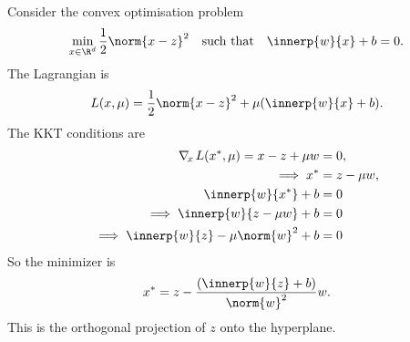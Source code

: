\begin{example}
    Consider the convex optimisation problem \[
        \min_{x \in \R^d} \frac12 \norm{x - z}^2 \quad \text{such that}
            \quad \innerp{w}{x} + b = 0.
    \] The Lagrangian is \[
        L(x, \mu) = \frac12 \norm{x - z}^2 + \mu(\innerp{w}{x} + b).
    \] The KKT conditions are \begin{align*}
        \nabla_{\!x\,} L(x^*, \mu) = x - z + \mu w &= 0, \\
        \implies x^* &= z - \mu w, \\
        \innerp{w}{x^*} + b &= 0 \\
        \implies \innerp{w}{z - \mu w} + b &= 0 \\
        \implies \innerp{w}{z} - \mu \norm{w}^2 + b &= 0
    \end{align*}
    So the minimizer is \[
        x^* = z - \frac{(\innerp{w}{z} + b)}{\norm{w}^2} w.
    \]
    This is the orthogonal projection of $z$ onto the hyperplane.
\end{example}

